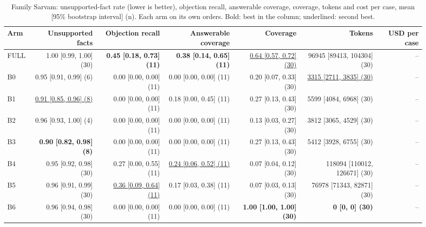 \begin{table}[htbp]
\centering\footnotesize
\begin{adjustbox}{max width=\textwidth}
\begin{tabular}{@{}lrrrrrr@{}}
\toprule
Arm & Unsupported facts & Objection recall & Answerable coverage & Coverage & Tokens & USD per case \\
\midrule
FULL & 1.00 [0.99, 1.00] (30) & \textbf{0.45 [0.18, 0.73] (11)} & \textbf{0.38 [0.14, 0.65] (11)} & \underline{0.64 [0.57, 0.72] (30)} & 96945 [89413, 104304] (30) & -- \\
B0 & 0.95 [0.91, 0.99] (6) & 0.00 [0.00, 0.00] (11) & 0.00 [0.00, 0.00] (11) & 0.20 [0.07, 0.33] (30) & \underline{3315 [2711, 3835] (30)} & -- \\
B1 & \underline{0.91 [0.85, 0.96] (8)} & 0.00 [0.00, 0.00] (11) & 0.18 [0.00, 0.45] (11) & 0.27 [0.13, 0.43] (30) & 5599 [4084, 6968] (30) & -- \\
B2 & 0.96 [0.93, 1.00] (4) & 0.00 [0.00, 0.00] (11) & 0.00 [0.00, 0.00] (11) & 0.13 [0.03, 0.27] (30) & 3812 [3065, 4529] (30) & -- \\
B3 & \textbf{0.90 [0.82, 0.98] (8)} & 0.00 [0.00, 0.00] (11) & 0.00 [0.00, 0.00] (11) & 0.27 [0.13, 0.43] (30) & 5412 [3928, 6755] (30) & -- \\
B4 & 0.95 [0.92, 0.98] (30) & 0.27 [0.00, 0.55] (11) & \underline{0.24 [0.06, 0.52] (11)} & 0.07 [0.04, 0.12] (30) & 118094 [110012, 126671] (30) & -- \\
B5 & 0.96 [0.91, 0.99] (30) & \underline{0.36 [0.09, 0.64] (11)} & 0.17 [0.03, 0.38] (11) & 0.07 [0.03, 0.13] (30) & 76978 [71343, 82871] (30) & -- \\
B6 & 0.96 [0.94, 0.98] (30) & 0.00 [0.00, 0.00] (11) & 0.00 [0.00, 0.00] (11) & \textbf{1.00 [1.00, 1.00] (30)} & \textbf{0 [0, 0] (30)} & -- \\
\bottomrule
\end{tabular}
\end{adjustbox}
\caption{Family Sarvam: unsupported-fact rate (lower is better), objection recall, answerable coverage, coverage, tokens and cost per case, mean [95\% bootstrap interval] (n). Each arm on its own orders. Bold: best in the column; underlined: second best.}
\label{tab:table1b_sarvam}
\end{table}